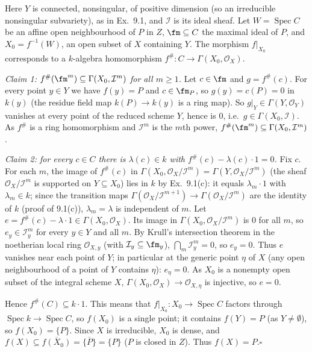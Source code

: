 \documentclass[11pt]{article}
\begin{document}
\pf
Here $Y$ is connected, nonsingular, of positive dimension (so an irreducible nonsingular subvariety), as in Ex.~9.1, and $\mathcal I$ is its ideal sheaf. Let $W=\operatorname{Spec}C$ be an affine open neighbourhood of $P$ in $Z$, $\fm\subseteq C$ the maximal ideal of $P$, and $X_0=f^{-1}(W)$, an open subset of $X$ containing $Y$. The morphism $f|_{X_0}$ corresponds to a $k$-algebra homomorphism $f^\#:C\to\Gamma(X_0,\mathcal O_X)$.

\emph{Claim 1: $f^\#(\fm^m)\subseteq\Gamma(X_0,\mathcal I^m)$ for all $m\ge1$.} Let $c\in\fm$ and $g=f^\#(c)$. For every point $y\in Y$ we have $f(y)=P$ and $c\in\fm_P$, so $g(y)=c(P)=0$ in $k(y)$ (the residue field map $k(P)\to k(y)$ is a ring map). So $g|_Y\in\Gamma(Y,\mathcal O_Y)$ vanishes at every point of the reduced scheme $Y$, hence is $0$, i.e.\ $g\in\Gamma(X_0,\mathcal I)$. As $f^\#$ is a ring homomorphism and $\mathcal I^m$ is the $m$th power, $f^\#(\fm^m)\subseteq\Gamma(X_0,\mathcal I^m)$.

\emph{Claim 2: for every $c\in C$ there is $\lambda(c)\in k$ with $f^\#(c)-\lambda(c)\cdot1=0$.} Fix $c$. For each $m$, the image of $f^\#(c)$ in $\Gamma(X_0,\mathcal O_X/\mathcal I^m)=\Gamma(Y,\mathcal O_X/\mathcal I^m)$ (the sheaf $\mathcal O_X/\mathcal I^m$ is supported on $Y\subseteq X_0$) lies in $k$ by Ex.~9.1(c): it equals $\lambda_m\cdot 1$ with $\lambda_m\in k$; since the transition maps $\Gamma(\mathcal O_X/\mathcal I^{m+1})\to\Gamma(\mathcal O_X/\mathcal I^m)$ are the identity of $k$ (proof of 9.1(c)), $\lambda_m=\lambda$ is independent of $m$. Let $e=f^\#(c)-\lambda\cdot1\in\Gamma(X_0,\mathcal O_X)$. Its image in $\Gamma(X_0,\mathcal O_X/\mathcal I^m)$ is $0$ for all $m$, so $e_y\in\mathcal I_y^m$ for every $y\in Y$ and all $m$. By Krull's intersection theorem in the noetherian local ring $\mathcal O_{X,y}$ (with $\mathcal I_y\subseteq\fm_y$), $\bigcap_m\mathcal I_y^m=0$, so $e_y=0$. Thus $e$ vanishes near each point of $Y$; in particular at the generic point $\eta$ of $X$ (any open neighbourhood of a point of $Y$ contains $\eta$): $e_\eta=0$. As $X_0$ is a nonempty open subset of the integral scheme $X$, $\Gamma(X_0,\mathcal O_X)\to\mathcal O_{X,\eta}$ is injective, so $e=0$.

Hence $f^\#(C)\subseteq k\cdot1$. This means that $f|_{X_0}:X_0\to\operatorname{Spec}C$ factors through $\operatorname{Spec}k\to\operatorname{Spec}C$, so $f(X_0)$ is a single point; it contains $f(Y)=P$ (as $Y\ne\emptyset$), so $f(X_0)=\{P\}$. Since $X$ is irreducible, $X_0$ is dense, and $f(X)\subseteq\overline{f(X_0)}=\overline{\{P\}}=\{P\}$ ($P$ is closed in $Z$). Thus $f(X)=P$.\hfill$\square$
\end{document}
